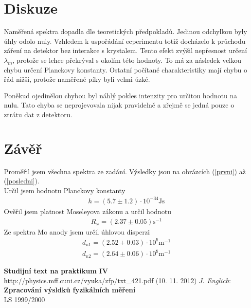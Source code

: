 \documentclass[a4paper,12pt]{article}
\begin{document}
\section{Diskuze}
Naměřená spektra dopadla dle teoretických předpokladů. Jedinou odchylkou byly úhly odolo nuly. Vzhledem k uspořádání ecperimentu totiž docházelo k průchodu záření na detektor bez 
interakce s krystalem. Tento efekt zvýšil nepřesnost určení $\lambda_m$, protože se lehce překrýval s okolím této hodnoty. To má za následek velkou chybu určení Planckovy konstanty.
Ostatní počítané charakteristiky mají chybu o řád nižší, protože naměřené píky byli velmi úzké.

Poněkud ojedinělou chybou byl náhlý pokles intenzity pro určitou hodnotu na nulu. Tato chyba se neprojevovala nijak pravidelně a zřejmě se jedná pouze o ztrátu dat z detektoru. 

\section{Závěř}
\noindent
Proměřil jsem všechna spektra ze zadání. Výsledky jsou na obrázcích (\ref{prvni}) až (\ref{posledni}).\\
Určil jsem hodnotu Planckovy konstanty
\begin{eqnarray}
h=(5.7 \pm 1.2)\cdot 10^{-34} \mbox{Js}
\end{eqnarray}
Ověřil jsem platnost Moseleyova zákonu a určil hodnotu
\begin{eqnarray}
R_\omega=(2.37\pm0.05) \mbox{s}^{-1}
\end{eqnarray}
Ze spektra Mo anody jsem určil úhlovou disperzi
\begin{eqnarray}
d_{n1}=(2.52 \pm 0.03)\cdot10^{9} \mbox{m}^{-1}\\
d_{n2}=(2.64 \pm 0.06)\cdot10^{9} \mbox{m}^{-1}
\end{eqnarray}

\begin{thebibliography}{5}
	 \textbf{Studijní text na praktikum IV} \\http://physics.mff.cuni.cz/vyuka/zfp/txt\_421.pdf (10. 11. 2012)
     \emph{J. Englich}: \textbf{Zpracování výsldků fyzikálních měření} \\ LS 1999/2000
\end{thebibliography}
\end{document}
